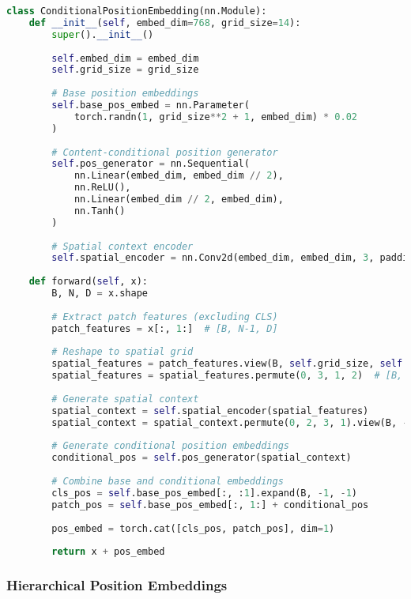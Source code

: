 \begin{lstlisting}[language=Python, caption=Conditional position embeddings]
class ConditionalPositionEmbedding(nn.Module):
    def __init__(self, embed_dim=768, grid_size=14):
        super().__init__()
        
        self.embed_dim = embed_dim
        self.grid_size = grid_size
        
        # Base position embeddings
        self.base_pos_embed = nn.Parameter(
            torch.randn(1, grid_size**2 + 1, embed_dim) * 0.02
        )
        
        # Content-conditional position generator
        self.pos_generator = nn.Sequential(
            nn.Linear(embed_dim, embed_dim // 2),
            nn.ReLU(),
            nn.Linear(embed_dim // 2, embed_dim),
            nn.Tanh()
        )
        
        # Spatial context encoder
        self.spatial_encoder = nn.Conv2d(embed_dim, embed_dim, 3, padding=1)
    
    def forward(self, x):
        B, N, D = x.shape
        
        # Extract patch features (excluding CLS)
        patch_features = x[:, 1:]  # [B, N-1, D]
        
        # Reshape to spatial grid
        spatial_features = patch_features.view(B, self.grid_size, self.grid_size, D)
        spatial_features = spatial_features.permute(0, 3, 1, 2)  # [B, D, H, W]
        
        # Generate spatial context
        spatial_context = self.spatial_encoder(spatial_features)
        spatial_context = spatial_context.permute(0, 2, 3, 1).view(B, -1, D)
        
        # Generate conditional position embeddings
        conditional_pos = self.pos_generator(spatial_context)
        
        # Combine base and conditional embeddings
        cls_pos = self.base_pos_embed[:, :1].expand(B, -1, -1)
        patch_pos = self.base_pos_embed[:, 1:] + conditional_pos
        
        pos_embed = torch.cat([cls_pos, patch_pos], dim=1)
        
        return x + pos_embed
\end{lstlisting}

\subsubsection{Hierarchical Position Embeddings}

